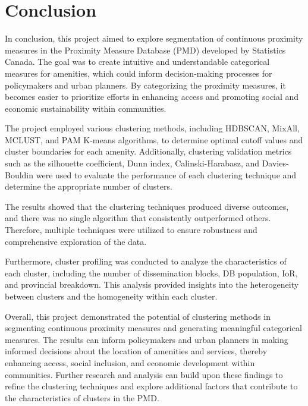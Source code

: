 \documentclass[11pt, a4paper]{article}
\begin{document}
\pagebreak 
\section{Conclusion}


In conclusion, this project aimed to explore segmentation of continuous proximity measures in the Proximity Measure Database (PMD) developed by Statistics Canada. The goal was to create intuitive and understandable categorical measures for amenities, which could inform decision-making processes for policymakers and urban planners. By categorizing the proximity measures, it becomes easier to prioritize efforts in enhancing access and promoting social and economic sustainability within communities.
\par
The project employed various clustering methods, including HDBSCAN, MixAll, MCLUST, and PAM K-means algorithms, to determine optimal cutoff values and cluster boundaries for each amenity. Additionally, clustering validation metrics such as the silhouette coefficient, Dunn index, Calinski-Harabasz, and Davies-Bouldin were used to evaluate the performance of each clustering technique and determine the appropriate number of clusters.
\par
The results showed that the clustering techniques produced diverse outcomes, and there was no single algorithm that consistently outperformed others. Therefore, multiple techniques were utilized to ensure robustness and comprehensive exploration of the data.
\par
Furthermore, cluster profiling was conducted to analyze the characteristics of each cluster, including the number of dissemination blocks, DB population, IoR, and provincial breakdown. This analysis provided insights into the heterogeneity between clusters and the homogeneity within each cluster.
\par
Overall, this project demonstrated the potential of clustering methods in segmenting continuous proximity measures and generating meaningful categorical measures. The results can inform policymakers and urban planners in making informed decisions about the location of amenities and services, thereby enhancing access, social inclusion, and economic development within communities. Further research and analysis can build upon these findings to refine the clustering techniques and explore additional factors that contribute to the characteristics of clusters in the PMD.
\end{document}

